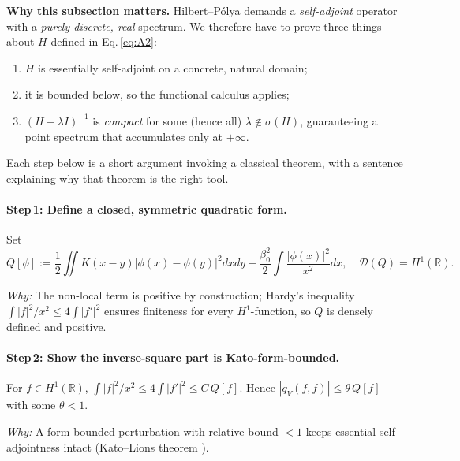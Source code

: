 \documentclass[11pt]{article}
\begin{document}
\noindent
\textbf{Why this subsection matters.}\;
Hilbert–Pólya demands a \emph{self-adjoint} operator with a
\emph{purely discrete, real} spectrum.  
We therefore have to prove three things about
\(H\) defined in Eq.\,\eqref{eq:A2}:

\begin{enumerate}
\item \(H\) is essentially self-adjoint on a concrete, natural domain;
\item it is bounded below, so the functional calculus applies;
\item \((H-\lambda I)^{-1}\) is \emph{compact} for some
      (hence all) \(\lambda\notin\sigma(H)\),
      guaranteeing a point spectrum that accumulates only at \(+\infty\).
\end{enumerate}
Each step below is a short argument invoking a classical theorem, with
a sentence explaining why that theorem is the right tool.

\vspace{.6em}
\paragraph{Step\,1: Define a closed, symmetric quadratic form.}

Set
\[
   Q[\phi]
   :=\frac12\iint K(x-y)\bigl|\phi(x)-\phi(y)\bigr|^{2}dxdy
     +\frac{\beta_{0}^{2}}{2}\int\frac{|\phi(x)|^{2}}{x^{2}}dx,
\quad
   \mathcal D(Q)=H^{1}(\mathbb R).
\]

\emph{Why:}  The non-local term is positive by construction;
Hardy’s inequality
\(
  \int |f|^{2}/x^{2}\le4\!\int|f'|^{2}
\)
ensures finiteness for every \(H^{1}\)-function, so \(Q\) is densely
defined and positive.

\vspace{.3em}
\paragraph{Step\,2: Show the inverse-square part is Kato-form-bounded.}

For \(f\in H^{1}(\mathbb R)\),
\(
   \int|f|^{2}/x^{2}\le4\int|f'|^{2}\le C\,Q[f].
\)
Hence
\(
   |q_{V}(f,f)|\le\theta\,Q[f]
\)
with some \(\theta<1\).

\emph{Why:}  A form-bounded perturbation with relative bound
\(<\!1\) keeps essential self-adjointness intact (Kato–Lions
theorem \cite[VI.1.33]{Kato1995}).
\end{document}
